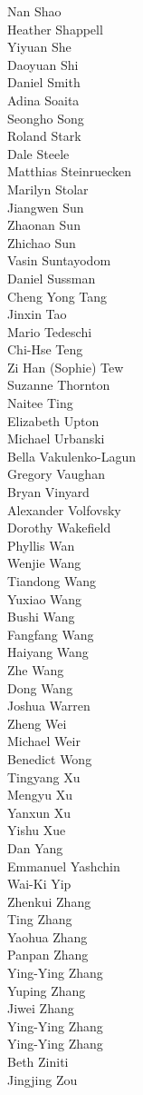 Nan Shao\\
Heather Shappell\\
Yiyuan She\\
Daoyuan Shi\\
Daniel Smith\\
Adina Soaita\\
Seongho Song\\
Roland Stark\\
Dale Steele\\
Matthias Steinruecken\\
Marilyn Stolar\\
Jiangwen Sun\\
Zhaonan Sun\\
Zhichao Sun\\
Vasin  Suntayodom\\
Daniel Sussman\\
Cheng Yong Tang\\
Jinxin Tao\\
Mario  Tedeschi\\
Chi-Hse Teng\\
Zi Han (Sophie) Tew\\
Suzanne Thornton\\
Naitee Ting\\
Elizabeth Upton\\
Michael Urbanski\\
Bella Vakulenko-Lagun\\
Gregory Vaughan\\
Bryan Vinyard\\
Alexander Volfovsky\\
Dorothy Wakefield\\
Phyllis Wan\\
Wenjie Wang\\
Tiandong Wang\\
Yuxiao Wang\\
Bushi Wang\\
Fangfang Wang\\
Haiyang Wang\\
Zhe Wang\\
Dong Wang\\
Joshua Warren\\
Zheng Wei\\
Michael Weir\\
Benedict Wong\\
Tingyang Xu\\
Mengyu Xu\\
Yanxun Xu\\
Yishu Xue\\
Dan Yang\\
Emmanuel Yashchin\\
Wai-Ki Yip\\
Zhenkui Zhang\\
Ting Zhang\\
Yaohua  Zhang\\
Panpan Zhang\\
Ying-Ying Zhang\\
Yuping Zhang\\
Jiwei Zhang\\
Ying-Ying Zhang\\
Ying-Ying Zhang\\
Beth Ziniti\\
Jingjing Zou\\
